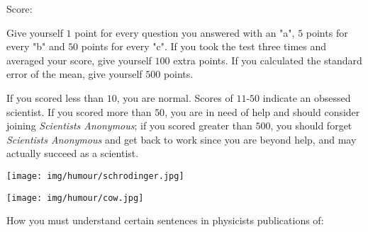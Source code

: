 Score:

Give yourself $1$ point for every question you answered with an "a", $5$ points for every "b" and $50$ points for every "c". If you took the test three times and averaged your score, give yourself $100$ extra points. If you calculated the standard error of the mean, give yourself $500$ points. 

If you scored less than $10$, you are normal. Scores of $11$-$50$ indicate an obsessed scientist. If you scored more than $50$, you are in need of help and should consider joining \textit{Scientists Anonymous}; if you scored greater than $500$, you should forget \textit{Scientists Anonymous} and get back to work since you are beyond help, and may actually succeed as a scientist.

\begin{center}\underline{\hspace{5 cm}}\end{center}

	\begin{center}
	\texttt{[image: img/humour/schrodinger.jpg]}
	\end{center}

	\begin{center}
	\texttt{[image: img/humour/cow.jpg]}
	\end{center}
	
\pagebreak

How you must understand certain sentences in physicists publications of:

